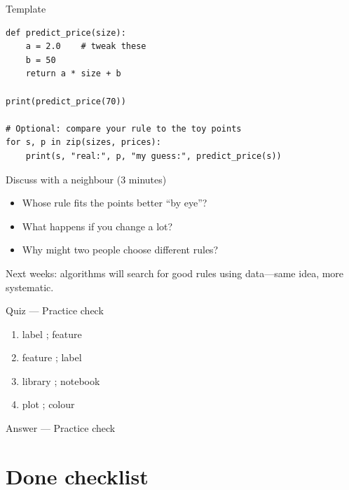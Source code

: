 \documentclass[aspectratio=169,11pt]{beamer}
\begin{document}
    \begin{frame}[fragile]{Template}
        \begin{lstlisting}
def predict_price(size):
    a = 2.0    # tweak these
    b = 50
    return a * size + b

print(predict_price(70))

# Optional: compare your rule to the toy points
for s, p in zip(sizes, prices):
    print(s, "real:", p, "my guess:", predict_price(s))
        \end{lstlisting}
    \end{frame}

    \begin{frame}{Discuss with a neighbour (3 minutes)}
        \begin{itemize}
            \item Whose rule fits the points better ``by eye''?
            \item What happens if you change  a lot?
            \item Why might two people choose different rules?
        \end{itemize}
        \vspace{0.5em}
        Next weeks: algorithms will search for good rules using data---same idea, more systematic.
    \end{frame}

    \begin{frame}{Quiz --- Practice check}
        \begin{enumerate}
            \item label ; feature
            \item feature ; label
            \item library ; notebook
            \item plot ; colour
        \end{enumerate}
        \quizpause
    \end{frame}

    \begin{frame}{Answer --- Practice check}
    \end{frame}

    \section{Done checklist}
\end{document}
